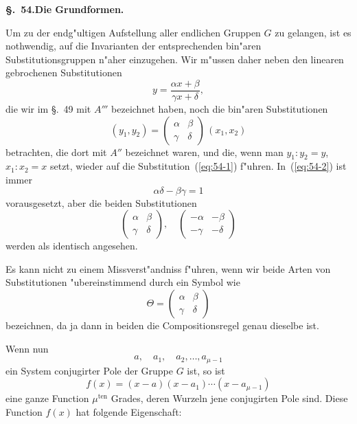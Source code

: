 \documentclass[12pt,a4paper]{article}
\theoremstyle{definition}
\begin{document}
\noindent\textbf{\S.~54.}\quad\textbf{Die Grundformen.}
\vspace{0.3cm}

Um zu der endg"ultigen Aufstellung aller endlichen Gruppen $G$ zu gelangen, ist es nothwendig, auf die Invarianten der entsprechenden bin"aren Substitutionsgruppen n"aher einzugehen. Wir m"ussen daher neben den linearen gebrochenen Substitutionen
\begin{equation}\label{eq:54-1}
y = \frac{\alpha x + \beta}{\gamma x + \delta},
\end{equation}
die wir im \S.~49 mit $A'''$ bezeichnet haben, noch die bin"aren Substitutionen
\begin{equation}\label{eq:54-2}
(y_1, y_2) = \begin{pmatrix} \alpha & \beta \\ \gamma & \delta \end{pmatrix}\,(x_1, x_2)
\end{equation}
betrachten, die dort mit $A''$ bezeichnet waren, und die, wenn man $y_1 : y_2 = y$, $x_1 : x_2 = x$ setzt, wieder auf die Substitution~(\ref{eq:54-1}) f"uhren. In~(\ref{eq:54-2}) ist immer
\begin{equation}\label{eq:54-3}
\alpha\delta - \beta\gamma = 1
\end{equation}
vorausgesetzt, aber die beiden Substitutionen
\[
\begin{pmatrix} \alpha & \beta \\ \gamma & \delta \end{pmatrix}, \quad
\begin{pmatrix} -\alpha & -\beta \\ -\gamma & -\delta \end{pmatrix}
\]
werden als identisch angesehen.

Es kann nicht zu einem Missverst"andniss f"uhren, wenn wir beide Arten von Substitutionen "ubereinstimmend durch ein Symbol wie
\[
\Theta = \begin{pmatrix} \alpha & \beta \\ \gamma & \delta \end{pmatrix}
\]
bezeichnen, da ja dann in beiden die Compositionsregel genau dieselbe ist.

Wenn nun
\begin{equation}\label{eq:54-4}
a, \quad a_1, \quad a_2, \ldots, a_{\mu-1}
\end{equation}
ein System conjugirter Pole der Gruppe $G$ ist, so ist
\begin{equation}\label{eq:54-5}
f(x) = (x - a)(x - a_1) \cdots (x - a_{\mu-1})
\end{equation}
eine ganze Function $\mu^{\text{ten}}$ Grades, deren Wurzeln jene conjugirten Pole sind. Diese Function $f(x)$ hat folgende Eigenschaft:
\end{document}
